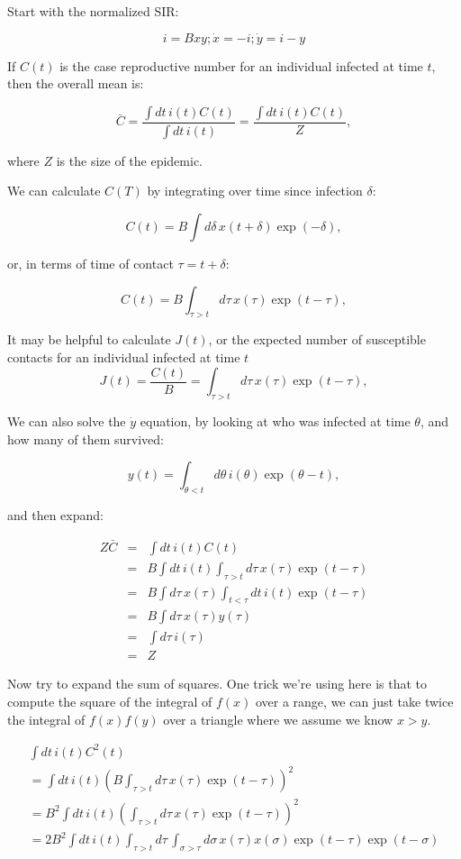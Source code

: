 \documentclass[12pt]{article}
\begin{document}
Start with the normalized SIR:

$$ i = Bxy; \dot x = -i; \dot y = i-y $$

If $C(t)$ is the case reproductive number for an individual infected at time $t$, then the overall mean is:

$$
	\bar C
	= \frac{\int{dt\, i(t) C(t)}}{\int{dt\, i(t)}}
	= \frac{\int{dt\, i(t) C(t)}}{Z},
$$

where $Z$ is the size of the epidemic.

We can calculate $C(T)$ by integrating over time since infection $\delta$:

$$C(t) = B \int{d\delta\, x(t+\delta) \exp(-\delta)}, $$

or, in terms of time of contact $\tau=t+\delta$:

$$C(t) = B \int_{\tau>t}{d\tau\, x(\tau) \exp(t-\tau)}, $$

It may be helpful to calculate $J(t)$, or the expected number of susceptible contacts for an individual infected at time $t$
$$J(t) = \frac{C(t)}{B} = \int_{\tau>t}{d\tau\, x(\tau) \exp(t-\tau)}, $$

We can also solve the $\dot y$ equation, by looking at who was infected at time $\theta$, and how many of them survived:

$$ y(t) = \int_{\theta<t}{d\theta\, i(\theta)\exp(\theta-t)},$$

and then expand:

\begin{eqnarray}
	Z \bar C
	&=& \int{dt\, i(t) C(t)}
	\\ &=& B \int{dt\, i(t) \int_{\tau>t}{d\tau\, x(\tau) \exp(t-\tau)}}
	\\ &=& B \int{d\tau\, x(\tau) \int_{t<\tau}dt\, i(t) \exp(t-\tau)}
	\\ &=& B \int{d\tau\, x(\tau) y(\tau)}
	\\ &=& \int{d\tau\, i(\tau)}
	\\ &=& Z
\end{eqnarray}

Now try to expand the sum of squares. One trick we're using here is that to compute the square of the integral of $f(x)$ over a range, we can just take twice the integral of $f(x)f(y)$ over a triangle where we assume we know $x>y$.

\begin{eqnarray}
\int{dt\, i(t) C^2(t)}
	\\ = \int{dt\, i(t) (B \int_{\tau>t}{d\tau\, x(\tau) \exp(t-\tau)})^2}
	\\ = B^2 \int{dt\, i(t) (\int_{\tau>t}{d\tau\, x(\tau) \exp(t-\tau)})^2}
	\\ =  2B^2 \int{dt\, i(t) \int_{\tau>t}{d\tau\, \int_{\sigma>\tau}{d\sigma\, x(\tau) x(\sigma) \exp(t-\tau)\exp(t-\sigma)}}}
\end{eqnarray}
\end{document}
